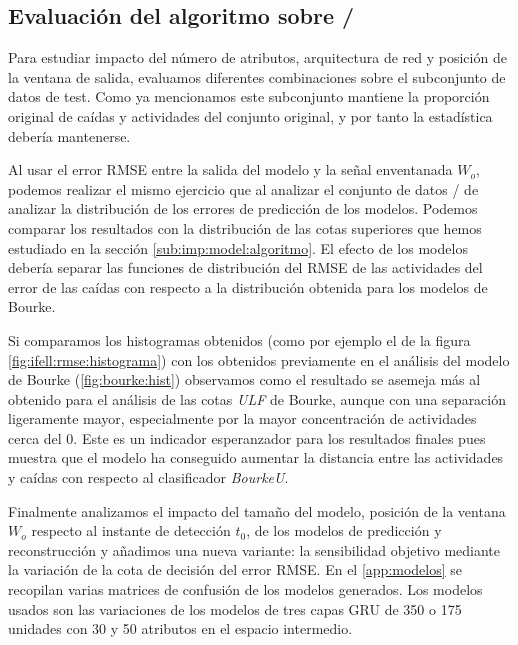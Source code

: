 \subsection{Evaluación del algoritmo sobre \ifell/}

Para estudiar impacto del número de atributos, arquitectura de red y posición de la ventana de salida, evaluamos diferentes combinaciones sobre el subconjunto de datos de test. Como ya mencionamos este subconjunto mantiene la proporción original de caídas y actividades del conjunto original, y por tanto la estadística debería mantenerse. 

Al usar el error RMSE entre la salida del modelo y la señal enventanada $W_o$, podemos realizar el mismo ejercicio que al analizar el conjunto de datos \ifell/ de analizar la distribución de los errores de predicción de los modelos. Podemos comparar los resultados con la distribución de las cotas superiores que hemos estudiado en la sección \ref{sub:imp:model:algoritmo}. El efecto de los modelos debería separar las funciones de distribución del RMSE de las actividades del error de las caídas con respecto a la distribución obtenida para los modelos de Bourke.



Si comparamos los histogramas obtenidos (como por ejemplo el de la figura \ref{fig:ifell:rmse:histograma}) con los obtenidos previamente en el análisis del modelo de Bourke (\ref{fig:bourke:hist}) observamos como el resultado se asemeja más al obtenido para el análisis de las cotas \textit{ULF} de Bourke, aunque con una separación ligeramente mayor, especialmente por la mayor concentración de actividades cerca del 0. Este es un indicador esperanzador para los resultados finales pues muestra que el modelo ha conseguido aumentar la distancia entre las actividades y caídas con respecto al clasificador \textit{BourkeU}.

Finalmente analizamos el impacto del tamaño del modelo, posición de la ventana $W_o$ respecto al instante de detección $t_0$, de los modelos de predicción y reconstrucción y añadimos una nueva variante: la sensibilidad objetivo mediante la variación de la cota de decisión del error RMSE. En el \autoref{app:modelos} se recopilan varias matrices de confusión de los modelos generados. Los modelos usados son las variaciones de los modelos de tres capas GRU de 350 o 175 unidades con 30 y 50 atributos en el espacio intermedio.


